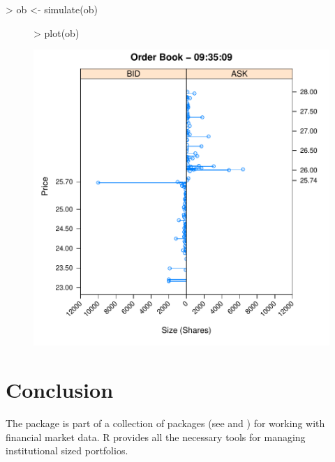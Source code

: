 \begin{Schunk}
\begin{Sinput}
> ob <- simulate(ob)
\end{Sinput}
\end{Schunk}
\begin{figure}
\centering
\vspace*{.1in}
\begin{Schunk}
\begin{Sinput}
> plot(ob)
\end{Sinput}
\end{Schunk}
\includegraphics[scale = 0.5]{orderbook-019}
\end{figure}

\section{Conclusion}

The  package is part of a collection of packages (see
\cite{kane:backtest} and \cite{kane:portfolio}) for working with
financial market data. R provides all the necessary tools for
managing institutional sized portfolios.

\address{David Kane\\
  Kane Capital Management\\
  Cambridge, MA\\
  USA}\\

